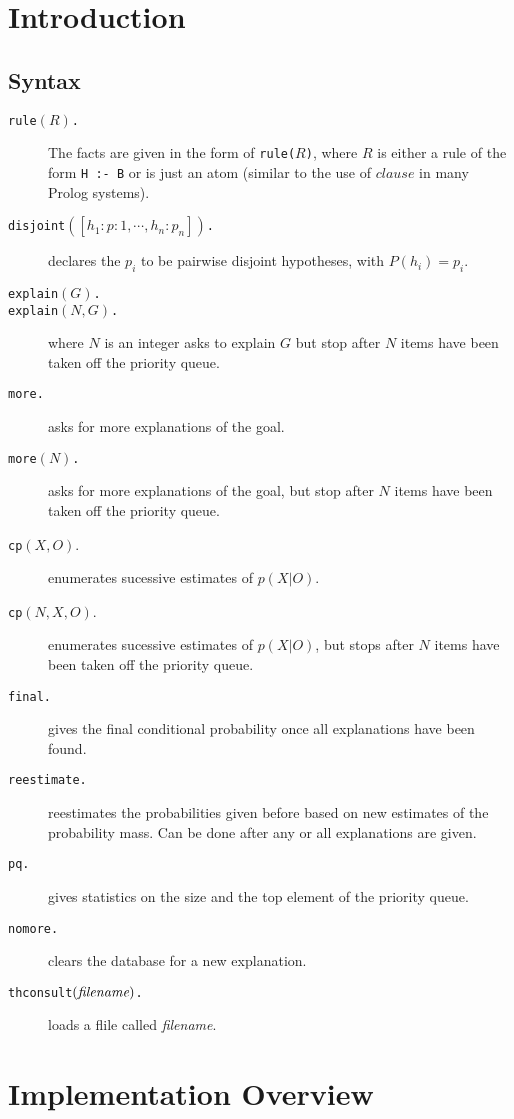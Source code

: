 \section{Introduction}
\subsection{Syntax} \label{vocabulary}
\begin{description}
\item[{\tt rule$(R)$.}]
The facts are
given in the form of {\tt rule($R$)}, where $R$ is either a rule of
the form {\tt H :- B} or is just an atom (similar to the use of
$clause$ in many Prolog systems).
\item[{\tt disjoint$([h_1:p:1,\cdots,h_n:p_n])$.}]declares
the $p_i$ to be pairwise disjoint hypotheses, with $P(h_i)=p_i$. 
\item[{\tt explain$(G)$.}] 
\item[{\tt explain$(N,G)$.}] where $N$ is an integer asks to explain
$G$ but stop after $N$ items have been taken off the priority queue. 
\item[{\tt more.}] asks for more explanations of the goal.
\item[{\tt more$(N)$.}] asks for more explanations of the goal, but stop
after $N$ items have been taken off the priority queue.
\item[{\tt cp$(X,O)$}.] enumerates sucessive estimates of $p(X|O)$.
\item[{\tt cp$(N,X,O)$}.] enumerates sucessive estimates of $p(X|O)$, 
but stops after $N$ items have been taken off the priority queue.
\item[{\tt final.}] gives the final conditional probability once all 
explanations have been found. 
\item[{\tt reestimate.}] reestimates the probabilities given before
based on new estimates of the probability mass. Can be done after any
or all explanations are given. 
\item[{\tt pq.}] gives statistics on the size and the top element of
the priority queue.
\item[{\tt nomore.}] clears the database for a new explanation.
\item[{\tt thconsult$(\hbox{\em filename})$.}] loads a flile called
{\em filename}. 
\end{description}

\section{Implementation Overview}
